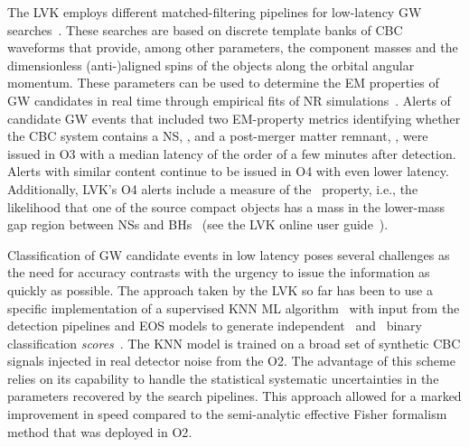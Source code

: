 The \ac{LVK} employs different matched-filtering pipelines for low-latency \ac{GW}
searches~\cite{Sachdev:2019vvd,PhysRevD.95.042001,Sachdev:2020lfd,Nitz:2018rgo,Adams:2015ulm,Chu:2020pjv,Klimenko:2015ypf}. These searches are based on discrete template banks of \ac{CBC}
waveforms that provide, among other parameters, the component masses and the dimensionless (anti-)aligned spins of the objects along the orbital angular momentum. These parameters can be
used to determine the \ac{EM} properties of \ac{GW} candidates in real time through empirical fits of \ac{NR} simulations~\cite{Foucart:2012nc,Foucart:2018rjc}. Alerts of candidate
\ac{GW} events that included two \ac{EM}-property metrics identifying whether the \ac{CBC} system contains a \ac{NS}, \hasns, and a post-merger matter remnant, \hasrem, were issued in
\ac{O3} with a median latency of the order of a few minutes after detection. Alerts with similar content continue to be issued in \ac{O4} with even lower latency.  Additionally,
\ac{LVK}'s \ac{O4} alerts include a measure of the \hasgap\ property, i.e., the likelihood that one of the source compact objects has a mass in the lower-mass gap region between \acp{NS}
and \acp{BH}~\cite{Farah:2021qom} (see the \ac{LVK} online user guide~\cite{UserGuide}). 

Classification of \ac{GW} candidate events in low latency poses several challenges as the need for accuracy contrasts with the urgency to issue the information as quickly as possible. The
approach taken by the \ac{LVK} so far has been to use a specific implementation of a supervised \ac{KNN} \ac{ML}
algorithm~\cite{Pedregosa:2011ork} with input from the detection pipelines and \ac{EOS} models to generate independent \hasns\ and \hasrem\ binary classification
\emph{scores}~\cite{Chatterjee:2019avs}. The \ac{KNN} model is trained on a broad set of synthetic \ac{CBC} signals injected in real detector noise from the \ac{O2}. The advantage of this
scheme relies on its capability to handle the statistical systematic uncertainties in the parameters recovered by the search pipelines. This approach allowed for a marked improvement in
speed compared to the semi-analytic effective Fisher formalism method that was deployed in \ac{O2}.

